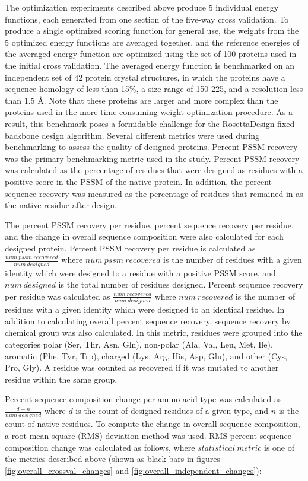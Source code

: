 The optimization experiments described above produce 5 individual energy functions, each generated from one section of the five-way cross validation.
To produce a single optimized scoring function for general use, the weights from the 5 optimized energy functions are averaged together, and the reference energies of the averaged energy function are optimized using the set of 100 proteins used in the initial  cross validation.
The averaged energy function is benchmarked on an independent set of 42 protein crystal structures, in which the proteins have a sequence homology of less than 15\%, a size range of 150-225, and a resolution less than 1.5 \AA.
Note that these proteins are larger and more complex than the proteins used in the more time-consuming weight optimization procedure.
As a result, this benchmark poses a formidable challenge for the RosettaDesign fixed backbone design algorithm.
Several different metrics were used during benchmarking to assess the quality of designed proteins.
Percent PSSM recovery was the primary benchmarking metric used in the study.
Percent PSSM recovery was calculated as the percentage of residues that were designed as residues with a positive score in the PSSM of the native protein.
In addition, the percent sequence recovery was measured as the percentage of residues that remained in as the native residue after design. 

The percent PSSM recovery per residue, percent sequence recovery per residue, and the change in overall sequence composition were also calculated for each designed protein.
Percent PSSM recovery per residue is calculated as $\frac{num\ pssm\ recovered}{num\ designed}$ where $num\ pssm\ recovered$ is the number of residues with a given identity which were designed to a residue with a positive PSSM score, and $num\ designed$ is the total number of residues designed. 
Percent sequence recovery per residue was calculated as $\frac{num\ recovered}{num\ designed}$ where $num\ recovered$ is the number of residues with a given identity which were designed to an identical residue.
In addition to calculating overall percent sequence recovery, sequence recovery by chemical group was also calculated.
In this metric, residues were grouped into the categories polar (Ser, Thr, Asn, Gln), non-polar (Ala, Val, Leu, Met, Ile), aromatic (Phe, Tyr, Trp), charged (Lys, Arg, His, Asp, Glu), and other (Cys, Pro, Gly). 
A residue was counted as recovered if it was mutated to another residue within the same group.

Percent sequence composition change per amino acid type was calculated as $\frac{d-n}{num\ designed}$ where $d$ is the count of designed residues of a given type, and $n$ is the count of native residues.
To compute the change in overall sequence composition, a root mean square (RMS) deviation method was used.
RMS percent sequence composition change was calculated as follows, where $statistical\ metric$ is one of the metrics described above (shown as black bars in figures \ref{fig:overall_crossval_changes} and \ref{fig:overall_independent_changes}):

